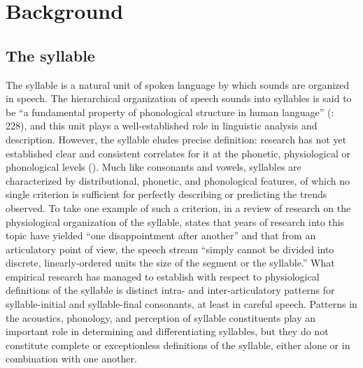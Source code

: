 \section{Background}\label{sec:1.1}
\subsection{The syllable}\label{sec:1.1.1}

  The syllable is a natural unit of spoken language by which sounds are organized in speech. The hierarchical organization of speech sounds into syllables is said to be “a fundamental property of phonological structure in human language” (\citealt{GoldsteinEtAl2006}: 228), and this unit plays a well-established role in linguistic analysis and description. However, the syllable eludes precise definition: research has not yet established clear and consistent correlates for it at the phonetic, physiological or phonological levels (\citealt{BellHooper1978,Laver1994,Krakow1999}). Much like consonants and vowels, syllables are characterized by distributional, phonetic, and phonological features, of which no single criterion is sufficient for perfectly describing or predicting the trends observed. To take one example of such a criterion, in a review of research on the physiological organization of the syllable, \citet[23-34]{Krakow1999} states that years of research into this topic have yielded “one disappointment after another” and that from an articulatory point of view, the speech stream “simply cannot be divided into discrete, linearly-ordered units the size of the segment or the syllable.” What empirical research has managed to establish with respect to physiological definitions of the syllable is distinct intra- and inter-articulatory patterns for syllable-initial and syllable-final consonants, at least in careful speech. Patterns in the acoustics, phonology, and perception of syllable constituents play an important role in determining and differentiating syllables, but they do not constitute complete or exceptionless definitions of the syllable, either alone or in combination with one another.


